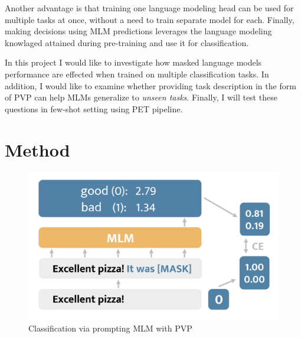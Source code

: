 \documentclass[11pt,a4paper]{article}
\begin{document}
Another advantage is that training one language modeling head can be used for multiple tasks at once, without a need to train separate model for each.
Finally, making decisions using MLM predictions leverages the language modeling knowlaged attained during pre-training and use it for classification.

In this project I would like to investigate how masked language models performance are effected when trained on multiple classification tasks.
In addition, I would like to examine whether providing task description in the form of PVP can help MLMs generalize to \textit{unseen tasks}.
Finally, I will test these questions in few-shot setting using PET pipeline.








\section{Method}

\begin{figure}[b]
	\centering
	\includegraphics[width=\linewidth]{mlm_classification}
	\caption{Classification via prompting MLM with PVP}
	\label{normal_case}
\end{figure}
\end{document}
